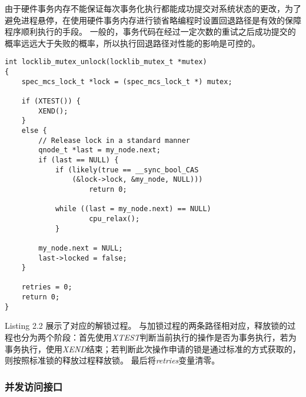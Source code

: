 由于硬件事务内存不能保证每次事务化执行都能成功提交对系统状态的更改，为了避免进程悬停，在使用硬件事务内存进行锁省略编程时设置回退路径是有效的保障程序顺利执行的手段。
一般的，事务代码在经过一定次数的重试之后成功提交的概率远远大于失败的概率，所以执行回退路径对性能的影响是可控的。

\begin{lstlisting}[caption = {基于Intel RTM的MCS解锁算法}]
int locklib_mutex_unlock(locklib_mutex_t *mutex)
{
    spec_mcs_lock_t *lock = (spec_mcs_lock_t *) mutex;

    if (XTEST()) {
        XEND();
    } 
    else {
        // Release lock in a standard manner
        qnode_t *last = my_node.next;
        if (last == NULL) {
            if (likely(true == __sync_bool_CAS
            	(&lock->lock, &my_node, NULL)))
                	return 0;

            while ((last = my_node.next) == NULL)
                	cpu_relax();
            }

        my_node.next = NULL;
        last->locked = false;
    }

    retries = 0;
    return 0;
}
\end{lstlisting}

Listing 2.2 展示了对应的解锁过程。
与加锁过程的两条路径相对应，释放锁的过程也分为两个阶段：首先使用\textit{XTEST}判断当前执行的操作是否为事务执行，若为事务执行，使用\textit{XEND}结束；若判断此次操作申请的锁是通过标准的方式获取的，则按照标准锁的释放过程释放锁。
最后将\textit{retries}变量清零。

\subsubsection{并发访问接口}

